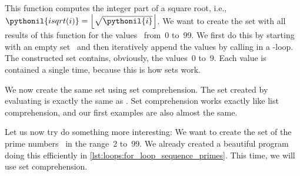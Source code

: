 This function computes the integer part of a square root, i.e., $\pythonil{isqrt(i)}=\left\lfloor\sqrt{\pythonil{i}}\right\rfloor$.
We want to create the set with all results of this function for the values~ from~0 to~99.
We first do this by starting with an empty set~ and then iteratively append the values by calling  in a -loop.
The constructed set contains, obviously, the values~0 to~9.
Each value is contained a single time, because this is how sets work.%
%
\begin{sloppypar}%
We now create the same set using set comprehension.
The set  created by evaluating  is exactly the same as .
Set comprehension works exactly like list comprehension, and our first examples are also almost the same.%
\end{sloppypar}%
%
Let us now try do something more interesting:
We want to create the set  of the prime numbers~\cite{W2024MAWWR:PN,CP2005PNACP,R1994PNACMFF} in the range~2 to~99.
We already created a beautiful program doing this efficiently in \cref{lst:loops:for_loop_sequence_primes}.
This time, we will use set comprehension.

